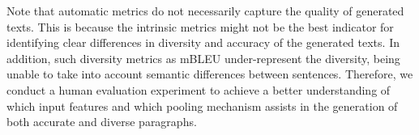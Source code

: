 \documentclass[11pt,a4paper]{article}
\begin{document}
Note that automatic metrics do not necessarily capture the quality of generated texts. %
This %
is because the intrinsic metrics might not be the best indicator for identifying clear differences in diversity and accuracy of the generated texts.
In addition, such diversity metrics as mBLEU under-represent the diversity, being unable to take into account semantic differences between sentences.
Therefore, we conduct a human evaluation experiment to achieve a better understanding of which input features and which pooling mechanism assists in the generation of both accurate and diverse paragraphs.



\end{document}
